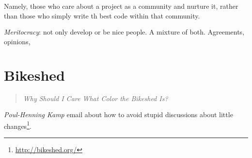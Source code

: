 \documentclass[11pt]{scrartcl}
\begin{document}
Namely, those who care about a project as a community and nurture it, rather than those who simply write th best code within that community.

\emph{Meritocracy}: not only develop or be nice people. A mixture of both. Agreements, opinions, 

\section{Bikeshed}
\label{sec:bikeshed}

\begin{quote}
    \emph{Why Should I Care What Color the Bikeshed Is?}
\end{quote}

\emph{Poul-Henning Kamp} email about how to avoid stupid discussions about little changes\footnote{\url{http://bikeshed.org/}}.



\end{document}
